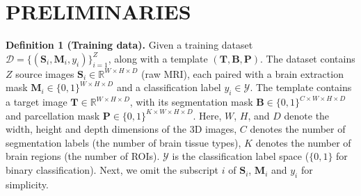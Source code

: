\section{PRELIMINARIES} 



\noindent \textbf{Definition 1 (Training data).}
Given a training dataset $\mathcal{D} = \{(\mathbf{S}_i,\mathbf{M}_i,y_i)\}_{i=1}^{Z}$, along with a template $(\mathbf{T}, \mathbf{B},\mathbf{P})$. The dataset contains $Z$ source images $\mathbf{S}_{i} \in \mathbb{R}^{W \times H \times D}$ (\eg raw MRI), each paired with a brain extraction mask $\mathbf{M}_i \in \{0,1\}^{W \times H \times D}$ and a classification label $y_i \in \mathcal{Y}$. 
The template contains a target image $\mathbf{T} \in \mathbb{R}^{W \times H \times D}$, with its segmentation mask $\mathbf{B} \in \{0, 1\}^{C \times W \times H \times D}$ and parcellation mask $\mathbf{P} \in \{0, 1\}^{K \times W \times H \times D}$. Here, $W$, $H$, and $D$ denote the width, height and depth dimensions of the 3D images, $C$ denotes the number of segmentation labels (\ie the number of brain tissue types), $K$ denotes the number of brain regions (\ie the number of ROIs). $\mathcal{Y}$ is the classification label space (\eg $\{0, 1\}$ for binary classification). Next, we omit the subscript $i$ of $\mathbf{S}_i$, $\mathbf{M}_i$ and $y_i$ for simplicity.

